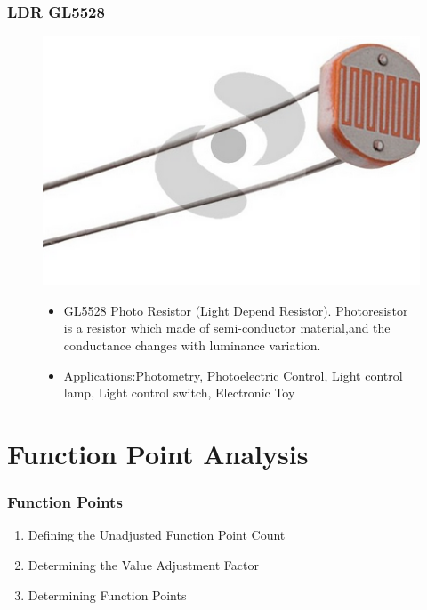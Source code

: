 \documentclass{beamer}
\begin{document}
\frame
{
	\frametitle{LDR GL5528}
	\begin{figure}[htbp]
	\begin{minipage}[t]{4.5cm}
	\vspace{0pt}
	\centering
	\includegraphics[width=\textwidth]{../Images/GL5528.png}
	\end{minipage}
	\hfill
	\begin{minipage}[t]{5cm}
	\vspace{10pt}
	\begin{itemize}
	\item GL5528 Photo Resistor (Light Depend Resistor). Photoresistor is a resistor which made of semi-conductor material,and the conductance changes with luminance variation.
	\item Applications:Photometry, Photoelectric Control, Light control lamp, Light control switch, Electronic Toy
	\end{itemize}
	\end{minipage}
	\end{figure}
	
}


\section{Function Point Analysis}
\frame
{
	\frametitle{Function Points}
	\begin{enumerate}
	\item Defining the Unadjusted Function Point Count
	\item Determining the Value Adjustment Factor
	\item Determining Function Points
	\end{enumerate}
}
\end{document}
